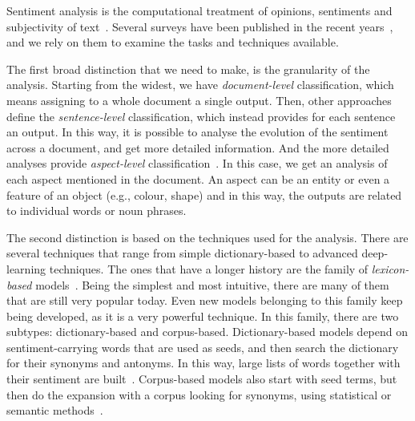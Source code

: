Sentiment analysis is the computational treatment of opinions, sentiments and subjectivity of text~\citep{medhat2014sentiment}.
Several surveys have been published in the recent years~\citep{liu2010sentiment,medhat2014sentiment,wankhade2022survey}, and we rely on them to examine the tasks and techniques available.



The first broad distinction that we need to make, is the granularity of the analysis.
Starting from the widest, we have \emph{document-level} classification, which means assigning to a whole document a single output.
Then, other approaches define the \emph{sentence-level} classification, which instead provides for each sentence an output. In this way, it is possible to analyse the evolution of the sentiment across a document, and get more detailed information.
And the more detailed analyses provide \emph{aspect-level} classification~\citep{zhang2022survey}. In this case, we get an analysis of each aspect mentioned in the document. An aspect can be an entity or even a feature of an object (e.g., colour, shape) and in this way, the outputs are related to individual words or noun phrases.

The second distinction is based on the techniques used for the analysis. There are several techniques that range from simple dictionary-based to advanced deep-learning techniques.
The ones that have a longer history are the family of \emph{lexicon-based} models~\citep{taboada2011lexicon}. Being the simplest and most intuitive, there are many of them that are still very popular today. Even new models belonging to this family keep being developed, as it is a very powerful technique.
In this family, there are two subtypes: dictionary-based and corpus-based.
Dictionary-based models depend on sentiment-carrying words that are used as seeds, and then search the dictionary for their synonyms and antonyms. In this way, large lists of words together with their sentiment are built~\citep{okango2022dictionary,hardeniya2016dictionary}.
Corpus-based models also start with seed terms, but then do the expansion with a corpus looking for synonyms, using statistical or semantic methods~\citep{darwich2019corpus,rice2021corpus}.


